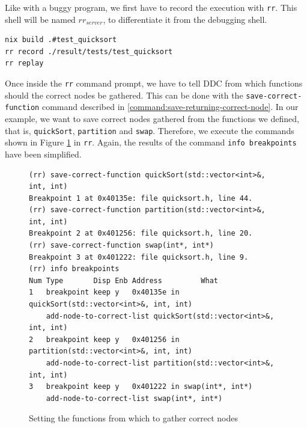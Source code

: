 Like with a buggy program, we first have to record the execution with \verb|rr|. This shell will be named \(rr_{server}\), to differentiate it from the debugging shell.
\begin{lstlisting}[language=bash, caption={Compiling, recording and replaying quickSort test cases}, frame=tb, label={lst:compileRecordReplayQuicksortTests}]
nix build .#test_quicksort
rr record ./result/tests/test_quicksort
rr replay
\end{lstlisting}
Once inside the \verb|rr| command prompt, we have to tell DDC from which functions should the correct nodes be gathered.
This can be done with the \verb|save-correct-function| command described in \ref{command:save-returning-correct-node}. In our example, we want to save correct nodes gathered from the functions we defined, that is, \verb|quickSort|, \verb|partition| and \verb|swap|. Therefore, we execute the commands shown in Figure \ref{fig:saving-correct-functions} in \verb|rr|. Again, the results of the command \verb|info breakpoints| have been simplified.
\begin{figure}[h]
    \centering
    \caption{Setting the functions from which to gather correct nodes}
    \label{fig:saving-correct-functions}
    \begin{verbatim}
(rr) save-correct-function quickSort(std::vector<int>&, int, int)
Breakpoint 1 at 0x40135e: file quicksort.h, line 44.
(rr) save-correct-function partition(std::vector<int>&, int, int)
Breakpoint 2 at 0x401256: file quicksort.h, line 20.
(rr) save-correct-function swap(int*, int*)
Breakpoint 3 at 0x401222: file quicksort.h, line 9.
(rr) info breakpoints
Num Type       Disp Enb Address         What
1   breakpoint keep y   0x40135e in quickSort(std::vector<int>&, int, int)
    add-node-to-correct-list quickSort(std::vector<int>&, int, int)
2   breakpoint keep y   0x401256 in partition(std::vector<int>&, int, int)
    add-node-to-correct-list partition(std::vector<int>&, int, int)
3   breakpoint keep y   0x401222 in swap(int*, int*)
    add-node-to-correct-list swap(int*, int*)
    \end{verbatim}
\end{figure}

